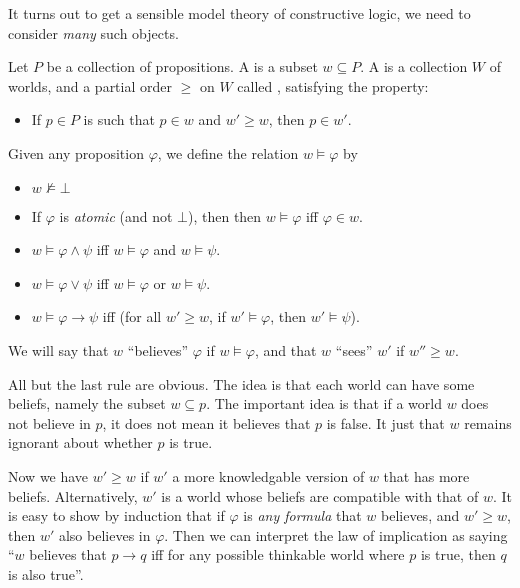 \documentclass[a4paper]{article}
\begin{document}
It turns out to get a sensible model theory of constructive logic, we need to consider \emph{many} such objects.

\begin{defi}
  Let $P$ be a collection of propositions. A  is a subset $w \subseteq P$. A  is a collection $W$ of worlds, and a partial order $\geq$ on $W$ called , satisfying the  property:
  \begin{itemize}
    \item If $p \in P$ is such that $p \in w$ and $w' \geq w$, then $p \in w'$.
  \end{itemize}
  Given any proposition $\varphi$, we define the relation $w \vDash \varphi$ by
  \begin{itemize}
    \item $w \not\vDash \bot$
    \item If $\varphi$ is \emph{atomic} (and not $\bot$), then then $w \vDash \varphi$ iff $\varphi \in w$.
    \item $w \vDash \varphi \wedge \psi$ iff $w \vDash \varphi$ and $w \vDash \psi$.
    \item $w \vDash \varphi \vee \psi$ iff $w \vDash \varphi$ or $w \vDash \psi$.
    \item $w \vDash \varphi \to \psi$ iff (for all $w' \geq w$, if $w' \vDash \varphi$, then $w' \vDash \psi$).
  \end{itemize}
  We will say that $w$ ``believes'' $\varphi$ if $w \vDash \varphi$, and that $w$ ``sees'' $w'$ if $w'' \geq w$.
\end{defi}
All but the last rule are obvious. The idea is that each world can have some beliefs, namely the subset $w \subseteq p$. The important idea is that if a world $w$ does not believe in $p$, it does not mean it believes that $p$ is false. It just that $w$ remains ignorant about whether $p$ is true.

Now we have $w' \geq w$ if $w'$ a more knowledgable version of $w$ that has more beliefs. Alternatively, $w'$ is a world whose beliefs are compatible with that of $w$. It is easy to show by induction that if $\varphi$ is \emph{any formula} that $w$ believes, and $w' \geq w$, then $w'$ also believes in $\varphi$. Then we can interpret the law of implication as saying ``$w$ believes that $p \to q$ iff for any possible thinkable world where $p$ is true, then $q$ is also true''.
\end{document}
